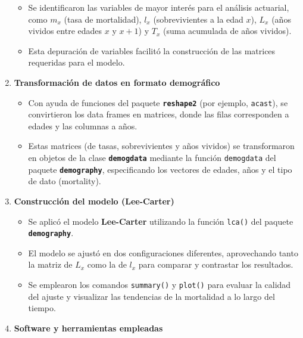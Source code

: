 \documentclass[
]{article}
\providecommand{\tightlist}{%
  \setlength{\itemsep}{0pt}\setlength{\parskip}{0pt}}
\begin{document}
\begin{enumerate}
  \begin{itemize}
  \tightlist
  \item
    Se identificaron las variables de mayor interés para el análisis
    actuarial, como \(m_x\) (tasa de mortalidad), \(l_x\)
    (sobrevivientes a la edad \(x\)), \(L_x\) (años vividos entre edades
    \(x\) y \(x+1\)) y \(T_x\) (suma acumulada de años vividos).\\
  \item
    Esta depuración de variables facilitó la construcción de las
    matrices requeridas para el modelo.
  \end{itemize}
\item
  \textbf{Transformación de datos en formato demográfico}

  \begin{itemize}
  \tightlist
  \item
    Con ayuda de funciones del paquete \textbf{\texttt{reshape2}} (por
    ejemplo, \texttt{acast}), se convirtieron los data frames en
    matrices, donde las filas corresponden a edades y las columnas a
    años.\\
  \item
    Estas matrices (de tasas, sobrevivientes y años vividos) se
    transformaron en objetos de la clase \textbf{\texttt{demogdata}}
    mediante la función \texttt{demogdata} del paquete
    \textbf{\texttt{demography}}, especificando los vectores de edades,
    años y el tipo de dato (mortality).
  \end{itemize}
\item
  \textbf{Construcción del modelo (Lee-Carter)}

  \begin{itemize}
  \tightlist
  \item
    Se aplicó el modelo \textbf{Lee-Carter} utilizando la función
    \texttt{lca()} del paquete \textbf{\texttt{demography}}.\\
  \item
    El modelo se ajustó en dos configuraciones diferentes, aprovechando
    tanto la matriz de \(L_x\) como la de \(l_x\) para comparar y
    contrastar los resultados.\\
  \item
    Se emplearon los comandos \texttt{summary()} y \texttt{plot()} para
    evaluar la calidad del ajuste y visualizar las tendencias de la
    mortalidad a lo largo del tiempo.
  \end{itemize}
\item
  \textbf{Software y herramientas empleadas}


\end{enumerate}
\end{document}
